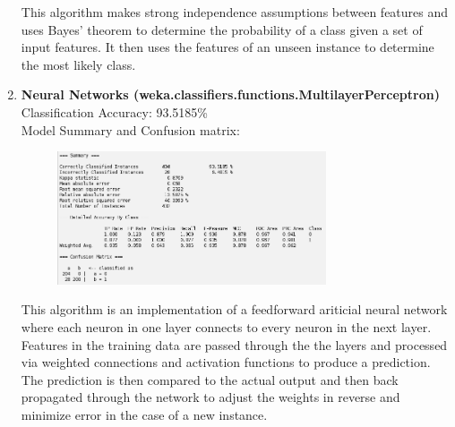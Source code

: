 \documentclass{article}
\begin{document}
\begin{enumerate}[label = (\alph*), left=10pt, itemsep=10pt]
\begin{minipage}[t]{0.9\textwidth}
\begin{figure}[H]
            \end{figure} 
            This algorithm makes strong independence assumptions between features and uses Bayes' theorem
            to determine the probability of a class given a set of input features. It then uses the features of an
            unseen instance to determine the most likely class. 
        \end{minipage}
        \item \begin{minipage}[t]{0.9\textwidth}
            \textbf{Neural Networks (weka.classifiers.functions.MultilayerPerceptron)}\\
             Classification Accuracy: 93.5185\%\\
             Model Summary and Confusion matrix:
             \begin{figure}[H]
                \includegraphics[width=0.75\textwidth, height=0.25\textheight]{./6e2.png}
            \end{figure}
            This algorithm is an implementation of a feedforward ariticial neural network where each neuron in one layer
            connects to every neuron in the next layer. Features in the training data are passed through the the layers
            and processed via weighted connections and activation functions to produce a prediction. The prediction is then
            compared to the actual output and then back propagated through the network to adjust the weights
            in reverse and minimize error in the case of a new instance.
        \end{minipage}

    \end{enumerate}
\end{document}
